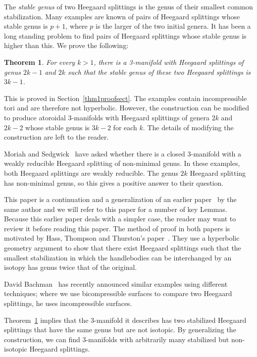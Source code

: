 \documentclass[12pt]{amsart}
\theoremstyle{plain}
\newtheorem{Thm}{Theorem}
\theoremstyle{definition}
\begin{document}
The \textit{stable genus} of two Heegaard splittings is the genus of their smallest common stabilization.  Many examples are known of pairs of Heegaard splittings whose stable genus is $p+1$, where $p$ is the larger of the two initial genera.  It has been a long standing problem to find pairs of Heegaard splittings whose stable genus is higher than this.  We prove the following:

\begin{Thm}
\label{mainthm}
For every $k > 1$, there is a 3-manifold with Heegaard splittings of genus $2k-1$ and $2k$ such that the stable genus of these two Heegaard splittings is $3k-1$.
\end{Thm}

This is proved in Section~\ref{thm1proofsect}.  The examples contain incompressible tori and are therefore not hyperbolic.  However, the construction can be modified to produce atoroidal 3-manifolds with Heegaard splittings of genera $2k$ and $2k-2$ whose stable genus is $3k-2$ for each $k$.  The details of modifying the construction are left to the reader.

Moriah and Sedgwick~\cite{morsedg} have asked whether there is a closed 3-manifold with a weakly reducible Heegaard splitting of non-minimal genus.  In these examples, both Heegaard splittings are weakly reducible.  The genus $2k$ Heegaard splitting has non-minimal genus, so this gives a positive answer to their question.

This paper is a continuation and a generalization of an earlier paper~\cite{me:stabs} by the same author and we will refer to this paper for a number of key Lemmas.  Because this earlier paper deals with a simpler case, the reader may want to review it before reading this paper.  The method of proof in both papers is motivated by Hass, Thompson and Thurston's paper~\cite{htt:stabs}.  They use a hyperbolic geometry argument to show that there exist Heegaard splittings such that the smallest stabilization in which the handlebodies can be interchanged by an isotopy has genus twice that of the original.

David Bachman~\cite{bachman} has recently announced similar examples using different techniques; where we use bicompressible surfaces to compare two Heegaard splittings, he uses incompressible surfaces.

Theorem~\ref{mainthm} implies that the 3-manifold it describes has two stabilized Heegaard splittings that have the same genus but are not isotopic.  By generalizing the construction, we can find 3-manifolds with arbitrarily many stabilized but non-isotopic Heegaard splittings.
\end{document}
